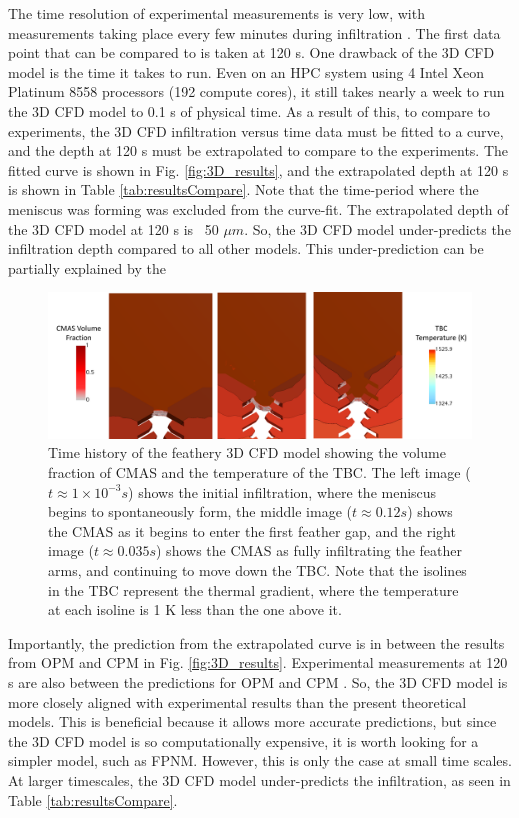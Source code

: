 \documentclass[%
 aip,
 amsmath,amssymb,
 reprint,%
]{revtex4-1}
\begin{document}
The time resolution of experimental measurements is very low, with measurements taking place every few minutes during infiltration \cite{Naraparaju2017}. The first data point that can be compared to is taken at 120 s. One drawback of the 3D CFD model is the time it takes to run. Even on an HPC system using 4 Intel Xeon Platinum 8558 processors (192 compute cores), it still takes nearly a week to run the 3D CFD model to 0.1 s of physical time. As a result of this, to compare to experiments, the 3D CFD infiltration versus time data must be fitted to a curve, and the depth at 120 s must be extrapolated to compare to the experiments. The fitted curve is shown in Fig. \ref{fig:3D_results}, and the extrapolated depth at 120 s is shown in Table \ref{tab:resultsCompare}. Note that the time-period where the meniscus was forming was excluded from the curve-fit. The extrapolated depth of the 3D CFD model at 120 s is ~50 $\mu m$. So, the 3D CFD model under-predicts the infiltration depth compared to all other models. This under-prediction can be partially explained by the 

\begin{figure}
    \centering
    \includegraphics[width=\linewidth]{Figures/3D_timehistory.png}
    \caption{Time history of the feathery 3D CFD model showing the volume fraction of CMAS and the temperature of the TBC. The left image ($t \approx 1\times 10^{-3}s$) shows the initial infiltration, where the meniscus begins to spontaneously form, the middle image ($t \approx 0.12 s$) shows the CMAS as it begins to enter the first feather gap, and the right image ($t \approx 0.035 s$) shows the CMAS as fully infiltrating the feather arms, and continuing to move down the TBC. Note that the isolines in the TBC represent the thermal gradient, where the temperature at each isoline is 1 K less than the one above it.}
    \label{fig:3D_timehistory}
\end{figure}

Importantly, the prediction from the extrapolated curve is in between the results from OPM and CPM in Fig. \ref{fig:3D_results}. Experimental measurements at 120 s are also between the predictions for OPM and CPM \cite{Naraparaju2017}. So, the 3D CFD model is more closely aligned with experimental results than the present theoretical models. This is beneficial because it allows more accurate predictions, but since the 3D CFD model is so computationally expensive, it is worth looking for a simpler model, such as FPNM. However, this is only the case at small time scales. At larger timescales, the 3D CFD model under-predicts the infiltration, as seen in Table \ref{tab:resultsCompare}. 
\end{document}
